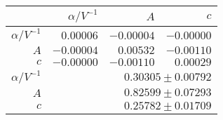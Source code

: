 \begin{table}
\caption{}
\centering
 \begin{tabular}{|r|r|r|r|}
 \hline 
\cellcolor{tabcolor}&\cellcolor{tabcolor}$\alpha/ V^{-1}$&\cellcolor{tabcolor}$A$&\cellcolor{tabcolor}$c$\\ \hline 
 \cellcolor{tabcolor}$\alpha/ V^{-1}$&$0.00006$ &$-0.00004$ &$-0.00000$ \\ 
\cellcolor{tabcolor}$A$&$-0.00004$ &$0.00532$ &$-0.00110$ \\ 
\cellcolor{tabcolor}$c$&$-0.00000$ &$-0.00110$ &$0.00029$ \\ \hline \hline
\cellcolor{tabcolor}$\alpha/ V^{-1}$&\multicolumn{3}{r|}{$0.30305 \pm 0.00792$ }\\ 
\cellcolor{tabcolor}$A$&\multicolumn{3}{r|}{$0.82599 \pm 0.07293$ }\\ 
\cellcolor{tabcolor}$c$&\multicolumn{3}{r|}{$0.25782 \pm 0.01709$ }\\ 
\hline\end{tabular}
\end{table}
